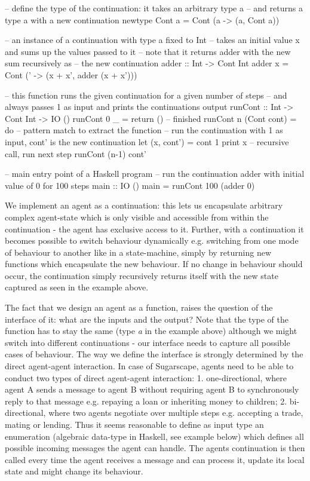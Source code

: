 \begin{HaskellCode}
-- define the type of the continuation: it takes an arbitrary type a 
-- and returns a type a with a new continuation
newtype Cont a = Cont (a -> (a, Cont a))

-- an instance of a continuation with type a fixed to Int
-- takes an initial value x and sums up the values passed to it
-- note that it returns adder with the new sum recursively as 
-- the new continuation
adder :: Int -> Cont Int
adder x = Cont (\x' -> (x + x', adder (x + x')))

-- this function runs the given continuation for a given number of steps
-- and always passes 1 as input and prints the continuations output
runCont :: Int -> Cont Int -> IO ()
runCont 0 _ = return () -- finished
runCont n (Cont cont) = do -- pattern match to extract the function
  -- run the continuation with 1 as input, cont' is the new continuation
  let (x, cont') = cont 1
  print x
  -- recursive call, run next step
  runCont (n-1) cont'

-- main entry point of a Haskell program
-- run the continuation adder with initial value of 0 for 100 steps 
main :: IO ()
main = runCont 100 (adder 0)
\end{HaskellCode}

We implement an agent as a continuation: this lets us encapsulate arbitrary complex agent-state which is only visible and accessible from within the continuation - the agent has exclusive access to it. Further, with a continuation it becomes possible to switch behaviour dynamically e.g. switching from one mode of behaviour to another like in a state-machine, simply by returning new functions which encapsulate the new behaviour. If no change in behaviour should occur, the continuation simply recursively returns itself with the new state captured as seen in the example above.

The fact that we design an agent as a function, raises the question of the interface of it: what are the inputs and the output? Note that the type of the function has to stay the same (type \textit{a} in the example above) although we might switch into different continuations - our interface needs to capture all possible cases of behaviour. The way we define the interface is strongly determined by the direct agent-agent interaction. In case of Sugarscape, agents need to be able to conduct two types of direct agent-agent interaction: 1. one-directional, where agent A sends a message to agent B without requiring agent B to synchronously reply to that message e.g. repaying a loan or inheriting money to children; 2. bi-directional, where two agents negotiate over multiple steps e.g. accepting a trade, mating or lending. Thus it seems reasonable to define as input type an enumeration (algebraic data-type in Haskell, see example below) which defines all possible incoming messages the agent can handle. The agents continuation is then called every time the agent receives a message and can process it, update its local state and might change its behaviour.

